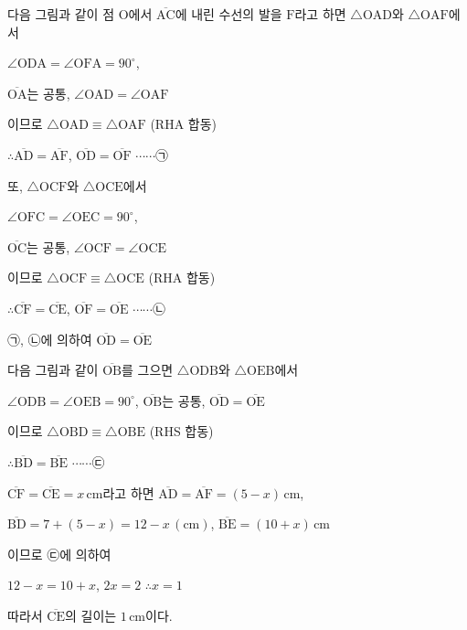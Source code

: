다음 그림과 같이 점 $\mathrm{O}$에서 $\overline{\mathrm{AC}}$에 내린 수선의 발을 $\mathrm{F}$라고 하면 $\triangle\mathrm{OAD}$와 $\triangle\mathrm{OAF}$에서

$\angle\mathrm{ODA} = \angle\mathrm{OFA} = 90^\circ$,

$\overline{\mathrm{OA}}$는 공통, $\angle\mathrm{OAD} = \angle\mathrm{OAF}$

이므로 $\triangle\mathrm{OAD} \equiv \triangle\mathrm{OAF}$ (RHA 합동)

$\therefore \overline{\mathrm{AD}} = \overline{\mathrm{AF}}$, $\overline{\mathrm{OD}} = \overline{\mathrm{OF}}$ $\cdots\cdots\mbox{㉠}$

또, $\triangle\mathrm{OCF}$와 $\triangle\mathrm{OCE}$에서

$\angle\mathrm{OFC} = \angle\mathrm{OEC} = 90^\circ$,

$\overline{\mathrm{OC}}$는 공통, $\angle\mathrm{OCF} = \angle\mathrm{OCE}$

이므로 $\triangle\mathrm{OCF} \equiv \triangle\mathrm{OCE}$ (RHA 합동)

$\therefore \overline{\mathrm{CF}} = \overline{\mathrm{CE}}$, $\overline{\mathrm{OF}} = \overline{\mathrm{OE}}$ $\cdots\cdots\mbox{㉡}$

㉠, ㉡에 의하여 $\overline{\mathrm{OD}} = \overline{\mathrm{OE}}$

다음 그림과 같이 $\overline{\mathrm{OB}}$를 그으면 $\triangle\mathrm{ODB}$와 $\triangle\mathrm{OEB}$에서

$\angle\mathrm{ODB} = \angle\mathrm{OEB} = 90^\circ$, $\overline{\mathrm{OB}}$는 공통, $\overline{\mathrm{OD}} = \overline{\mathrm{OE}}$

이므로 $\triangle\mathrm{OBD} \equiv \triangle\mathrm{OBE}$ (RHS 합동)

$\therefore \overline{\mathrm{BD}} = \overline{\mathrm{BE}}$ $\cdots\cdots\mbox{㉢}$

$\overline{\mathrm{CF}} = \overline{\mathrm{CE}} = x\,\mathrm{cm}$라고 하면 $\overline{\mathrm{AD}} = \overline{\mathrm{AF}} = (5 - x)\,\mathrm{cm}$,

$\overline{\mathrm{BD}} = 7 + (5 - x) = 12 - x\,(\mathrm{cm})$, $\overline{\mathrm{BE}} = (10 + x)\,\mathrm{cm}$

이므로 ㉢에 의하여

$12 - x = 10 + x$, $2x = 2$ $\therefore x = 1$

따라서 $\overline{\mathrm{CE}}$의 길이는 $1\,\mathrm{cm}$이다.
